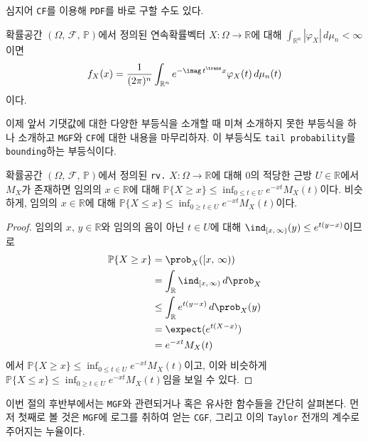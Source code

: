 심지어 \texttt{CF}를 이용해 \texttt{PDF}를 바로 구할 수도 있다.

\begin{theorem}
    확률공간 $(\Omega,\,\mathcal{F},\,\mathbb{P})$에서 정의된 연속확률벡터 $X:\Omega\to\mathbb{R}$에 대해 $\int_{\mathbb{R}^n}|\varphi_X|\,d\mu_n<\infty$이면
    \begin{equation*}
        f_X(x)=\frac{1}{(2\pi)^n}\int_{\mathbb{R}^n}e^{-\imag\,t^\trans x}\varphi_X(t)\,d\mu_n(t)
    \end{equation*}
    이다.
\end{theorem}

이제 앞서 기댓값에 대한 다양한 부등식을 소개할 때 미쳐 소개하지 못한 부등식을 하나 소개하고 \texttt{MGF}와 \texttt{CF}에 대한 내용을 마무리하자. 이 부등식도 \texttt{tail probability}를 \texttt{bounding}하는 부등식이다.

\begin{theorem}
    확률공간 $(\Omega,\,\mathcal{F},\,\mathbb{P})$에서 정의된 \texttt{rv.} $X:\Omega\to\mathbb{R}$에 대해 $0$의 적당한 근방 $U\in\mathbb{R}$에서 $M_X$가 존재하면 임의의 $x\in\mathbb{R}$에 대해 $\mathbb{P}\{X\geq x\}\leq\inf_{0\leq t\in U}e^{-xt}M_X(t)$이다. 비슷하게, 임의의 $x\in\mathbb{R}$에 대해 $\mathbb{P}\{X\leq x\}\leq\inf_{0\geq t\in U}e^{-xt}M_X(t)$이다.
\end{theorem}

\begin{proof}
    임의의 $x,\,y\in\mathbb{R}$와 임의의 음이 아닌 $t\in U$에 대해 $\ind_{[x,\,\infty)}(y)\leq e^{t(y-x)}$이므로
    \begin{align*}
        \mathbb{P}\{X\geq x\}&=\prob_X([x,\,\infty))\\
        &=\int_\mathbb{R}\ind_{[x,\,\infty)}\,d\prob_X\\
        &\leq\int_\mathbb{R}e^{t(y-x)}\,d\prob_X(y)\\
        &=\expect(e^{t(X-x)})\\
        &=e^{-xt}M_X(t)
    \end{align*}
    에서 $\mathbb{P}\{X\geq x\}\leq\inf_{0\leq t\in U}e^{-xt}M_X(t)$이고, 이와 비슷하게 $\mathbb{P}\{X\leq x\}\leq\inf_{0\geq t\in U}e^{-xt}M_X(t)$임을 보일 수 있다.
\end{proof}

이번 절의 후반부에서는 \texttt{MGF}와 관련되거나 혹은 유사한 함수들을 간단히 살펴본다. 먼저 첫째로 볼 것은 \texttt{MGF}에 로그를 취하여 얻는 \texttt{CGF}, 그리고 이의 \texttt{Taylor} 전개의 계수로 주어지는 누율이다.

